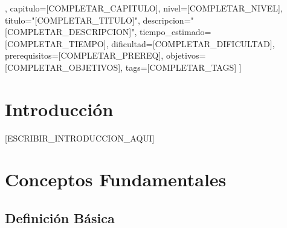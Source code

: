 % 
%

\begin{teoria}[
  materia=[COMPLETAR_MATERIA],          %
  capitulo=[COMPLETAR_CAPITULO],        %
  nivel=[COMPLETAR_NIVEL],              %
  titulo="[COMPLETAR_TITULO]",          %
  descripcion="[COMPLETAR_DESCRIPCION]", %
  tiempo_estimado=[COMPLETAR_TIEMPO],   %
  dificultad=[COMPLETAR_DIFICULTAD],    %
  prerequisitos={[COMPLETAR_PREREQ]},   %
  objetivos={[COMPLETAR_OBJETIVOS]},    %
  tags={[COMPLETAR_TAGS]}               %
]


\section{Introducción}

[ESCRIBIR_INTRODUCCION_AQUI]



\section{Conceptos Fundamentales}

\subsection{Definición Básica}


\end{teoria}
